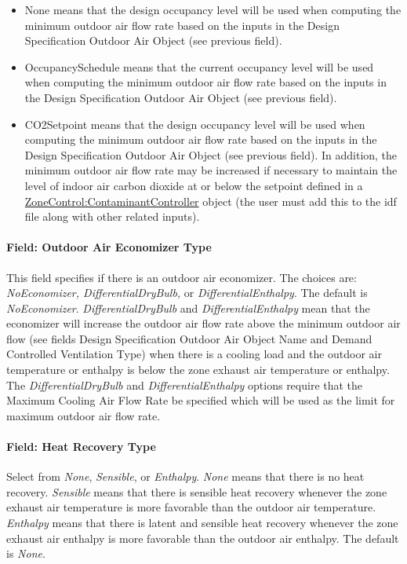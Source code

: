 \begin{itemize}
\item
  None means that the design occupancy level will be used when computing the minimum outdoor air flow rate based on the inputs in the Design Specification Outdoor Air Object (see previous field).
\item
  OccupancySchedule means that the current occupancy level will be used when computing the minimum outdoor air flow rate based on the inputs in the Design Specification Outdoor Air Object (see previous field).
\item
  CO2Setpoint means that the design occupancy level will be used when computing the minimum outdoor air flow rate based on the inputs in the Design Specification Outdoor Air Object (see previous field). In addition, the minimum outdoor air flow rate may be increased if necessary to maintain the level of indoor air carbon dioxide at or below the setpoint defined in a \hyperref[zonecontrolcontaminantcontroller]{ZoneControl:ContaminantController} object (the user must add this to the idf file along with other related inputs).
\end{itemize}

\paragraph{Field: Outdoor Air Economizer Type}\label{field-outdoor-air-economizer-type}

This field specifies if there is an outdoor air economizer. The choices are: \emph{NoEconomizer, DifferentialDryBulb,} or \emph{DifferentialEnthalpy}. The default is \emph{NoEconomizer}. \emph{DifferentialDryBulb} and \emph{DifferentialEnthalpy} mean that the economizer will increase the outdoor air flow rate above the minimum outdoor air flow (see fields Design Specification Outdoor Air Object Name and Demand Controlled Ventilation Type) when there is a cooling load and the outdoor air temperature or enthalpy is below the zone exhaust air temperature or enthalpy. The \emph{DifferentialDryBulb} and \emph{DifferentialEnthalpy} options require that the Maximum Cooling Air Flow Rate be specified which will be used as the limit for maximum outdoor air flow rate.

\paragraph{Field: Heat Recovery Type}\label{field-heat-recovery-type}

Select from \emph{None}, \emph{Sensible}, or \emph{Enthalpy}. \emph{None} means that there is no heat recovery. \emph{Sensible} means that there is sensible heat recovery whenever the zone exhaust air temperature is more favorable than the outdoor air temperature. \emph{Enthalpy} means that there is latent and sensible heat recovery whenever the zone exhaust air enthalpy is more favorable than the outdoor air enthalpy. The default is \emph{None}.

